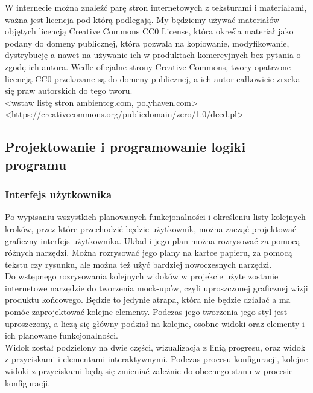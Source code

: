 \documentclass{article} %
\begin{document}
            W internecie można znaleźć parę stron internetowych z teksturami i materiałami, ważna jest licencja pod którą podlegają. My będziemy używać materiałów objętych licencją Creative Commons CC0 License, która określa materiał jako podany do domeny publicznej, która pozwala na kopiowanie, modyfikowanie, dystrybucję a nawet na używanie ich w produktach komercyjnych bez pytania o zgodę ich autora. Wedle oficjalne strony Creative Commons, twory opatrzone licencją CC0 przekazane są do domeny publicznej, a ich autor całkowicie zrzeka się praw autorskich do tego tworu.
            \\
            
            <wstaw listę stron ambientcg.com, polyhaven.com> \\
            <https://creativecommons.org/publicdomain/zero/1.0/deed.pl>
            \\
            
    \subsection{Projektowanie i programowanie logiki programu}
    
        \subsubsection{Interfejs użytkownika}
            Po wypisaniu wszystkich planowanych funkcjonalności i określeniu listy kolejnych kroków, przez które przechodzić będzie użytkownik, można zacząć projektować graficzny interfejs użytkownika. Układ i jego plan można rozrysować za pomocą różnych narzędzi. Można rozrysować jego plany na kartce papieru, za pomocą tekstu czy rysunku, ale można też użyć bardziej nowoczesnych narzędzi.
            \\
            
            Do wstępnego rozrysowania kolejnych widoków w projekcie użyte zostanie internetowe narzędzie do tworzenia mock-upów, czyli uproszczonej graficznej wizji produktu końcowego. Będzie to jedynie atrapa, która nie będzie działać a ma pomóc zaprojektować kolejne elementy. Podczas jego tworzenia jego styl jest uproszczony, a liczą się główny podział na kolejne, osobne widoki oraz elementy i ich planowane funkcjonalności.
            \\
            
            Widok został podzielony na dwie części, wizualizacja z linią progresu, oraz widok z przyciskami i elementami interaktywnymi. Podczas procesu konfiguracji, kolejne widoki z przyciskami będą się zmieniać zależnie do obecnego stanu w procesie konfiguracji. 
            \\
            
\end{document}
